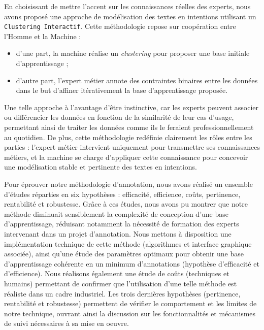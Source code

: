 		En choisissant de mettre l'accent sur les connaissances réelles des experts, nous avons proposé une approche de modélisation des textes en intentions utilisant un \texttt{Clustering Interactif}.
		Cette méthodologie repose sur coopération entre l'Homme et la Machine :
		\begin{itemize}
			\item d'une part, la machine réalise un \textit{clustering} pour proposer une base initiale d'apprentissage ;
			\item d'autre part, l'expert métier annote des contraintes binaires entre les données dans le but d'affiner itérativement la base d'apprentissage proposée.
		\end{itemize}
		Une telle approche à l'avantage d'être instinctive, car les experts peuvent associer ou différencier les données en fonction de la similarité de leur cas d'usage, permettant ainsi de traiter les données comme ils le feraient professionnellement au quotidien.
		De plus, cette méthodologie redéfinie clairement les rôles entre les parties : l'expert métier intervient uniquement pour transmettre ses connaissances métiers, et la machine se charge d'appliquer cette connaissance pour concevoir une modélisation stable et pertinente des textes en intentions.
		
		
		Pour éprouver notre méthodologie d'annotation, nous avons réalisé un ensemble d'études réparties en six hypothèses : efficacité, efficience, coûts, pertinence, rentabilité et robustesse.
		Grâce à ces études, nous avons pu montrer que notre méthode diminuait sensiblement la complexité de conception d'une base d'apprentissage, réduisant notamment la nécessité de formation des experts intervenant dans un projet d'annotation.
		Nous mettons à disposition une implémentation technique de cette méthode (algorithmes et interface graphique associée), ainsi qu'une étude des paramètres optimaux pour obtenir une base d'apprentissage cohérente en un minimum d'annotations (hypothèse d'efficacité et d'efficience).
		Nous réalisons également une étude de coûts (techniques et humains) permettant de confirmer que l'utilisation d'une telle méthode est réaliste dans un cadre industriel.
		Les trois dernières hypothèses (pertinence, rentabilité et robustesse) permettent de vérifier le comportement et les limites de notre technique, ouvrant ainsi la discussion sur les fonctionnalités et mécanismes de suivi nécessaires à sa mise en oeuvre.
		
